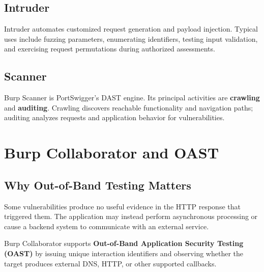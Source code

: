 \documentclass[11pt]{article}
\begin{document}
\subsection{Intruder}

Intruder automates customized request generation and payload injection. Typical uses include fuzzing parameters, enumerating identifiers, testing input validation, and exercising request permutations during authorized assessments.

\subsection{Scanner}

Burp Scanner is PortSwigger's DAST engine. Its principal activities are \textbf{crawling} and \textbf{auditing}. Crawling discovers reachable functionality and navigation paths; auditing analyzes requests and application behavior for vulnerabilities.

\section{Burp Collaborator and OAST}

\subsection{Why Out-of-Band Testing Matters}

Some vulnerabilities produce no useful evidence in the HTTP response that triggered them. The application may instead perform asynchronous processing or cause a backend system to communicate with an external service.

Burp Collaborator supports \textbf{Out-of-Band Application Security Testing (OAST)} by issuing unique interaction identifiers and observing whether the target produces external DNS, HTTP, or other supported callbacks.

\begin{center}
\end{center}
\end{document}
